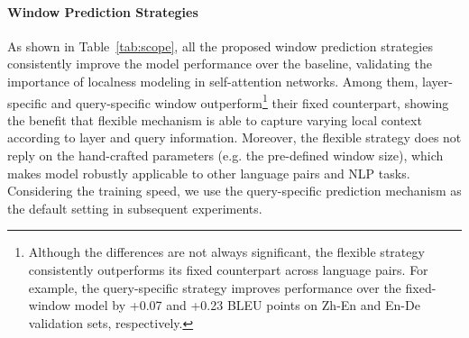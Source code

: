 \documentclass[11pt,a4paper]{article}
\begin{document}
\paragraph{Window Prediction Strategies}


 
As shown in Table~\ref{tab:scope}, all the proposed window prediction strategies consistently improve the model performance over the baseline, validating the importance of localness modeling in self-attention networks.
Among them, layer-specific and query-specific window outperform\footnote{{Although the differences are not always significant, the flexible strategy consistently outperforms its fixed counterpart across language pairs. For example, the query-specific strategy improves performance over the fixed-window model by +0.07 and +0.23 BLEU points on Zh-En and En-De validation sets, respectively.}} their fixed counterpart, showing the benefit that flexible mechanism is able to capture varying local context according to layer and query information.
Moreover, the flexible strategy does not reply on the hand-crafted parameters (e.g. the pre-defined window size), which makes model robustly applicable to other language pairs and NLP tasks.
Considering the training speed, we use the query-specific prediction mechanism as the default setting in subsequent experiments.

\iffalse
both the NMT systems with the enhanced phrasal information consistently outperforms the baseline of \textsc{Transformer}. This reveals the importance of the locality for self-attention model. In addition, the better results obtained by layer-specific and query-specific model verified that using a consistent local size insufficiently capture the richness of the semantic, more context and query information benefits to the prediction of the locality, thus, improve the translation quality.  Although there is no progressive improvement comparing with the layer-specific model, the query-specific model provides a more flexible strategy to predict the local sizes, besides requires even less parameters and training time. \fi
\end{document}
